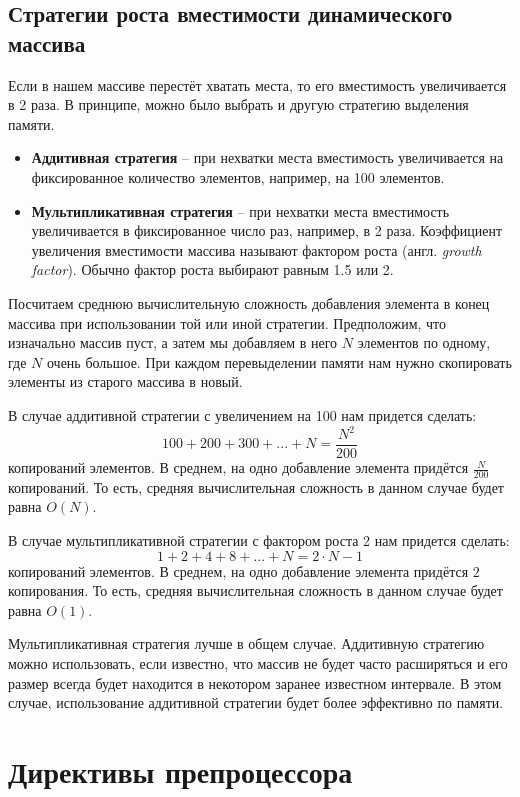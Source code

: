 \documentclass{article}
\begin{document}
\subsection*{Стратегии роста вместимости динамического массива}
Если в нашем массиве перестёт хватать места, то его вместимость увеличивается в 2 раза. В принципе, можно было выбрать и другую стратегию выделения памяти.

\begin{itemize}
\item \textbf{Аддитивная стратегия} -- при нехватки места вместимость увеличивается на фиксированное количество элементов, например, на 100 элементов.
\item \textbf{Мультипликативная стратегия} -- при нехватки места вместимость увеличивается в фиксированное число раз, например, в 2 раза. Коэффициент увеличения вместимости массива называют фактором роста (англ. \textit{growth factor}). Обычно фактор роста выбирают равным 1.5 или 2.
\end{itemize}
Посчитаем среднюю вычислительную сложность добавления элемента в конец массива при использовании той или иной стратегии. Предположим, что изначально массив пуст, а затем мы добавляем в него $N$ элементов по одному, где $N$ очень большое. При каждом перевыделении памяти нам нужно скопировать элементы из старого массива в новый. 

В случае аддитивной стратегии с увеличением на 100 нам придется сделать:
$$
100 + 200 + 300 + ... + N = \frac{N^2}{200} 
$$
копирований элементов. В среднем, на одно добавление элемента придётся $\frac{N}{200}$ копирований. То есть, средняя вычислительная сложность в данном случае будет равна $O(N)$.

В случае мультипликативной стратегии с фактором роста 2 нам придется сделать:
$$
1 + 2 + 4 + 8 + ... + N = 2 \cdot N - 1
$$
копирований элементов. В среднем, на одно добавление элемента придётся $2$ копирования. То есть, средняя вычислительная сложность в данном случае будет равна $O(1)$.

Мультипликативная стратегия лучше в общем случае. Аддитивную стратегию можно использовать, если известно, что массив не будет часто расширяться и его размер всегда будет находится в некотором заранее известном интервале. В этом случае, использование аддитивной стратегии будет более эффективно по памяти.


\newpage
\section*{Директивы препроцессора}
\end{document}

